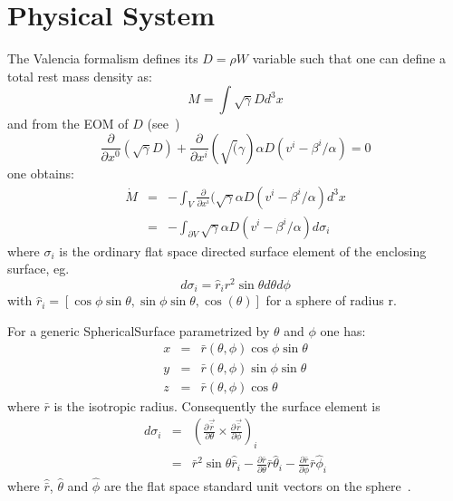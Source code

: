 \section{Physical System}
The Valencia formalism defines its $D = \rho W$ variable such that one can define a 
total rest mass density as:
\begin{displaymath}
    M = \int \sqrt{\gamma} D d^3x
\end{displaymath}
and from the EOM of $D$ (see~\cite{lrr-font})
\begin{displaymath}
    \frac{\partial }{\partial x^0} (\sqrt{\gamma}D )+ 
    \frac{\partial }{\partial x^i} (\sqrt(\gamma) \alpha D (v^i- 
      \beta^i/\alpha) = 0
\end{displaymath}
one obtains:
\begin{eqnarray}
\dot M
&=& - \int_V \frac{\partial }{\partial x^i} 
   (\sqrt\gamma \alpha D(v^i - \beta^i/\alpha) d^3x \\
&=& -\int_{\partial V} \sqrt\gamma \alpha D (v^i-\beta^i/\alpha) d\sigma_i
\end{eqnarray}
where $\sigma_i$ is the ordinary flat space directed surface element of 
the enclosing surface, eg.\
\begin{displaymath}
d\sigma_i = \hat r_i r^2 \sin\theta d\theta d\phi
\end{displaymath}
with $\hat r_i = [\cos\phi\sin\theta, \sin\phi\sin\theta,
\cos(\theta)]$ 
for a sphere of radius r.

For a generic SphericalSurface parametrized by $\theta$ and $\phi$ one has:
\begin{eqnarray}
    x &=& \bar r(\theta, \phi) \cos\phi \sin\theta \\
    y &=& \bar r(\theta, \phi) \sin\phi \sin\theta \\
    z &=& \bar r(\theta, \phi)          \cos\theta
\end{eqnarray}
where $\bar r$ is the isotropic radius.
Consequently the surface element is
\begin{eqnarray}
    d \sigma_i 
    &=& \left( 
        \frac{\partial\vec{\bar r}}{\partial\theta} \times
        \frac{\partial\vec{\bar r}}{\partial\phi}
        \right)_i \\
    &=& \bar r^2 \sin\theta \hat{\bar r}_i 
        - \frac{\partial\bar r}{\partial\theta} \bar r \hat \theta_i
        - \frac{\partial\bar r}{\partial\phi} \bar r \hat \phi_i
\end{eqnarray}
where $\hat{\bar r}$, $\hat \theta$ and $\hat \phi$ are the flat space
standard unit vectors on the sphere~\cite{mtw:73}. 

